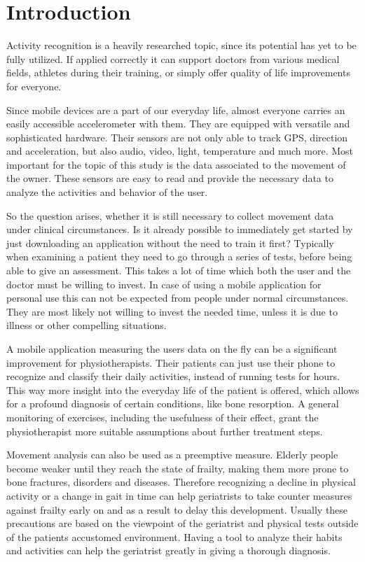 \section{Introduction}
\label{section:introduction}

Activity recognition is a heavily researched topic, since its potential has yet to be fully utilized. If applied correctly it can support doctors from various medical fields, athletes during their training, or simply offer quality of life improvements for everyone.

Since mobile devices are a part of our everyday life, almost everyone carries an easily accessible accelerometer with them. They are equipped with versatile and sophisticated hardware. Their sensors are not only able to track GPS, direction and acceleration, but also audio, video, light, temperature and much more. Most important for the topic of this study is the data associated to the movement of the owner. These sensors are easy to read and provide the necessary data to analyze the activities and behavior of the user.

So the question arises, whether it is still necessary to collect movement data under clinical circumstances. Is it already possible to immediately get started by just downloading an application without the need to train it first? Typically when examining a patient they need to go through a series of tests, before being able to give an assessment. This takes a lot of time which both the user and the doctor must be willing to invest. In case of using a mobile application for personal use this can not be expected from people under normal circumstances. They are most likely not willing to invest the needed time, unless it is due to illness or other compelling situations.

A mobile application measuring the users data on the fly can be a significant improvement for physiotherapists. Their patients can just use their phone to recognize and classify their daily activities, instead of running tests for hours. This way more insight into the everyday life of the patient is offered, which allows for a profound diagnosis of certain conditions, like bone resorption. A general monitoring of exercises, including the usefulness of their effect, grant the physiotherapist more suitable assumptions about further treatment steps. 

Movement analysis can also be used as a preemptive measure. Elderly people become weaker until they reach the state of frailty, making them more prone to bone fractures, disorders and diseases. Therefore recognizing a decline in physical activity or a change in gait in time can help geriatrists to take counter measures against frailty early on and as a result to delay this development. Usually these precautions are based on the viewpoint of the geriatrist and physical tests outside of the patients accustomed environment. Having a tool to analyze their habits and activities can help the geriatrist greatly in giving a thorough diagnosis.

